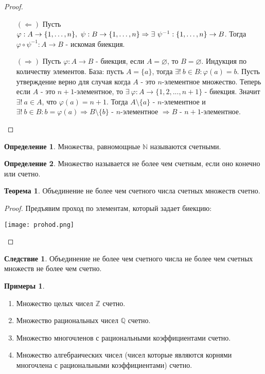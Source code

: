 \documentclass[a4paper, 12pt]{article}
\newcommand{\Z}{\mathbb{Z}}
\newcommand{\N}{\mathbb{N}}
\newcommand{\Q}{\mathbb{Q}}
\renewcommand{\phi}{\varphi}
\renewcommand{\emptyset}{\varnothing}
\newcommand\tab[1][.5cm]{\hspace*{#1}}
\theoremstyle{definition}
\newtheorem*{definition}{Определение}
\newtheorem*{theorem}{Теорема}
\newtheorem*{consequense}{Следствие}
\newtheorem*{examples}{Примеры}
\begin{document}
        \begin{proof}\tab
            \begin{itemize}
                \item[$(\Leftarrow)$] Пусть $\phi:A\to \{1,\dots, n\}, \ \psi:B\to \{1,\dots, n\}\\
                \Rightarrow \exists \ \psi^{-1}:\{1,\dots, n\}\to B$. Тогда $\phi \circ \psi^{-1}:A\to B$ - искомая биекция.
                \item[$(\Rightarrow)$] Пусть $\phi:A\to B$ - биекция, если $A=\emptyset$, то $B=\emptyset$. Индукция по количеству элементов. База: пусть $A=\{a\}$, тогда $\exists ! \ b\in B: \phi(a)=b$. Пусть утверждение верно для случая когда $A$ - это $n$-элементное множество. Теперь если $A$ - это $n+1$-элементное, то $\exists \ \phi:A\to \{1,2,...,n+1\}$ - биекция. Значит $\exists ! \ a\in A$, что $\phi(a)=n+1$. Тогда $A\setminus\{a\}$ - $n$-элементное и $\exists ! \ b\in B: b=\phi(a) \Rightarrow B\setminus\{b\}$ - $n$-элементное $\Rightarrow  B$ - $n+1$-элементное.
            \end{itemize}
        \end{proof}
        \begin{definition}
            Множества, равномощные $\N$ называются счетными.
        \end{definition} 
        \begin{definition}
            Множество называется не более чем счетным, если оно конечно или счетно.
        \end{definition}
        \begin{theorem}
            Объединение не более чем счетного числа счетных множеств счетно.
        \end{theorem}
        \begin{proof}
            Предъявим проход по элементам, который задает биекцию:
            \begin{center}
                \texttt{[image: prohod.png]}
            \end{center}
        \end{proof}
        \begin{consequense}
            Объединение не более чем счетного числа не более чем счетных множеств не более чем счетно.
        \end{consequense} 
        \begin{examples}\tab
            \begin{enumerate}
                \item Множество целых чисел $\Z$ счетно.
                \item Множество рациональных чисел $\Q$ счетно.
                \item Множество многочленов с рациональными коэффициентами счетно.
                \item Множество алгебраических чисел (чисел которые являются корнями многочлена с рациональными коэффициентами) счетно.
            \end{enumerate}
        \end{examples}
\end{document}
